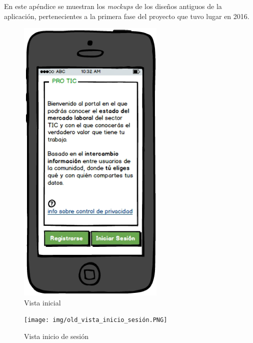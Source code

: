 \documentclass[a4paper, 12pt]{book}
\begin{document}
    En este apéndice se muestran los \emph{mockups} de los diseños antiguos de la aplicación, pertenecientes a la primera
    fase del proyecto que tuvo lugar en 2016.

    \begin{figure}
        \centering
        \includegraphics[width=7cm, keepaspectratio]{img/old_vista_inicial.PNG}
        \caption{Vista inicial}
    \end{figure}

    \begin{figure}
        \centering
        \texttt{[image: img/old\_vista\_inicio\_sesión.PNG]}
        \caption{Vista inicio de sesión}
    \end{figure}
\end{document}
